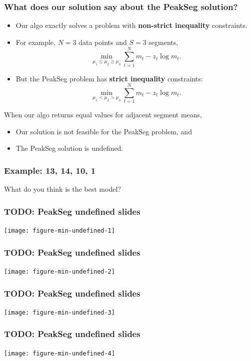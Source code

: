\documentclass{beamer}
\begin{document}
\begin{frame}
  \frametitle{What does our solution say about the PeakSeg solution?}
  \begin{itemize}
  \item Our algo exactly solves a problem with \textbf{non-strict
      inequality} constraints.
  \item For example, $N=3$ data points and $S=3$ segments,
    \begin{equation*}
      \min_{\mu_1\leq\mu_2\geq\mu_3}
      \sum_{t=1}^N m_t - z_t\log m_t.
    \end{equation*}
  \item But the PeakSeg problem has \textbf{strict inequality}
    constraints:
    \begin{equation*}
      \min_{\mu_1<\mu_2 >\mu_3}
      \sum_{t=1}^N m_t - z_t\log m_t.
    \end{equation*}
  \end{itemize}
  When our algo returns equal values for adjacent segment means,
  \begin{itemize}
  \item Our solution is not feasible for the PeakSeg problem, and
  \item The PeakSeg solution is undefined.
  \end{itemize}
\end{frame}

\begin{frame}
  \frametitle{Example: 13, 14, 10, 1}
  What do you think is the best model?
\end{frame}

\begin{frame}
  \frametitle{TODO: PeakSeg undefined slides}
  \texttt{[image: figure-min-undefined-1]}
\end{frame}

\begin{frame}
  \frametitle{TODO: PeakSeg undefined slides}
  \texttt{[image: figure-min-undefined-2]}
\end{frame}

\begin{frame}
  \frametitle{TODO: PeakSeg undefined slides}
  \texttt{[image: figure-min-undefined-3]}
\end{frame}

\begin{frame}
  \frametitle{TODO: PeakSeg undefined slides}
  \texttt{[image: figure-min-undefined-4]}
\end{frame}
\end{document}
